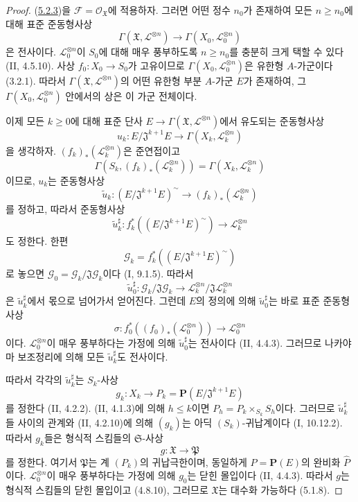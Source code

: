 \begin{proof}
(\hyperref[III.5.2.3-fr]{5.2.3})을
$\mathcal F=\mathcal O_{\mathfrak X}$에 적용하자. 그러면 어떤 정수
$n_0$가 존재하여 모든 $n\geq n_0$에 대해 표준 준동형사상
\[
\Gamma(\mathfrak X,\mathcal L^{\otimes n})
\longrightarrow\Gamma(X_0,\mathcal L_0^{\otimes n})
\]
은 전사이다. $\mathcal L_0^{\otimes n}$이 $S_0$에 대해 매우
풍부하도록 $n\geq n_0$를 충분히 크게 택할 수 있다
(II, 4.5.10). 사상 $f_0:X_0\to S_0$가 고유이므로
$\Gamma(X_0,\mathcal L_0^{\otimes n})$은 유한형 $A$-가군이다
(3.2.1). 따라서
$\Gamma(\mathfrak X,\mathcal L^{\otimes n})$의 어떤 유한형
부분 $A$-가군 $E$가 존재하여, 그
$\Gamma(X_0,\mathcal L_0^{\otimes n})$ 안에서의 상은 이 가군
전체이다.

이제 모든 $k\geq0$에 대해 표준 단사
$E\to\Gamma(\mathfrak X,\mathcal L^{\otimes n})$에서 유도되는
준동형사상
\[
u_k:E/\mathfrak J^{k+1}E\longrightarrow
\Gamma(X_k,\mathcal L_k^{\otimes n})
\]
을 생각하자. $(f_k)_*(\mathcal L_k^{\otimes n})$은 준연접이고
\[
\Gamma(S_k,(f_k)_*(\mathcal L_k^{\otimes n}))
=\Gamma(X_k,\mathcal L_k^{\otimes n})
\]
이므로, $u_k$는 준동형사상
\[
\widetilde u_k:(E/\mathfrak J^{k+1}E)^\sim
\longrightarrow(f_k)_*(\mathcal L_k^{\otimes n})
\]
를 정하고, 따라서 준동형사상
\[
\widetilde u_k^\sharp:
f_k^*((E/\mathfrak J^{k+1}E)^\sim)
\longrightarrow\mathcal L_k^{\otimes n}
\]
도 정한다. 한편
\[
\mathcal G_k=f_k^*((E/\mathfrak J^{k+1}E)^\sim)
\]
로 놓으면 $\mathcal G_0=\mathcal G_k/\mathfrak J\mathcal G_k$이다
(I, 9.1.5). 따라서
\[
\widetilde u_0^\sharp:
\mathcal G_k/\mathfrak J\mathcal G_k
\longrightarrow
\mathcal L_k^{\otimes n}/\mathfrak J\mathcal L_k^{\otimes n}
\]
은 $\widetilde u_k^\sharp$에서 몫으로 넘어가서 얻어진다. 그런데
$E$의 정의에 의해 $\widetilde u_0^\sharp$는 바로 표준 준동형사상
\[
\sigma:f_0^*((f_0)_*(\mathcal L_0^{\otimes n}))
\longrightarrow\mathcal L_0^{\otimes n}
\]
이다. $\mathcal L_0^{\otimes n}$이 매우 풍부하다는 가정에 의해
$\widetilde u_0^\sharp$는 전사이다 (II, 4.4.3). 그러므로 나카야마
보조정리에 의해 모든 $\widetilde u_k^\sharp$도 전사이다.

따라서 각각의 $\widetilde u_k^\sharp$는 $S_k$-사상
\[
g_k:X_k\longrightarrow P_k
=\mathbf P(E/\mathfrak J^{k+1}E)
\]
를 정한다 (II, 4.2.2). (II, 4.1.3)에 의해 $h\leq k$이면
$P_h=P_k\times_{S_k}S_h$이다. 그러므로
$\widetilde u_k^\sharp$들 사이의 관계와 (II, 4.2.10)에 의해
$(g_k)$는 아딕 $(S_k)$-귀납계이다 (I, 10.12.2). 따라서 $g_k$들은
형식적 스킴들의 $\mathfrak S$-사상
\[
g:\mathfrak X\to\mathfrak P
\]
를 정한다. 여기서 $\mathfrak P$는 계 $(P_k)$의 귀납극한이며,
동일하게 $P=\mathbf P(E)$의 완비화 $\widehat P$이다.
$\mathcal L_0^{\otimes n}$이 매우 풍부하다는 가정에 의해 $g_0$는
닫힌 몰입이다 (II, 4.4.3). 따라서 $g$는 형식적 스킴들의 닫힌
몰입이고 (4.8.10), 그러므로 $\mathfrak X$는 대수화 가능하다
(5.1.8).


\end{proof}
